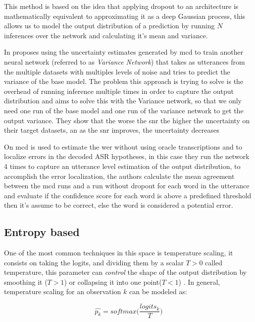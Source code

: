 This method is based on the idea that applying dropout to an architecture is mathematically equivalent to approximating it as a deep Gaussian process, this allows us to model the output distribution of a prediction by running $N$ inferences over the network and calculating it's mean and variance. \cite{gal2016dropout}\cite{oneactua2021evaluation}

In \cite{aralikatti2018global} proposes using the uncertainty estimates generated by \acrshort{mcd} to train another neural network (referred to as \textit{Variance Network}) that takes as utterances from the multiple datasets with multiples levels of noise and tries to predict the variance of the base model. The problem this approach is trying to solve is the overhead of running inference multiple times in order to capture the output distribution and aims to solve this with the Variance network, so that we only need one run of the base model and one run of the variance network to get the output variance. They show that the worse the \acrshort{snr} the higher the uncertainty on their target datasets, an as the \acrshort{snr} improves, the uncertainty decreases

On \cite{vyas2019analyzing} \acrshort{mcd} is used to estimate the \acrfull{wer} without using oracle transcriptions and to localize errors in the decoded ASR hypotheses, in this case they run the network 4 times to capture an utterance level estimation of the output distribution, to accomplish the error localization, the authors calculate the mean agreement between the \acrshort{mcd} runs and a run without dropout for each word in the utterance and evaluate if the confidence score for each word is above a predefined threshold then it's assume to be correct, else the word is considered a potential error.

\subsection{Entropy based}

One of the most common techniques in this space is temperature scaling, it consists on taking the logits, and dividing them by a scalar $T > 0$ called temperature, this parameter can \textit{control} the shape of the output distribution by smoothing it ($T > 1$) or collapsing it into one point($T < 1$) \cite{guo2017calibration} \cite{oneactua2021evaluation}. In general, temperature scaling for an observation $k$ can be modeled as:

\begin{equation}\label{ec:ts}
   \hat{p_{k}} = softmax\Bigg(\frac{logits_{k}}{T}\Bigg)
\end{equation}

